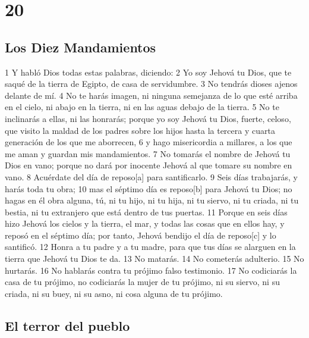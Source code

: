 \chapter{20}

\section*{Los Diez Mandamientos}

1 Y habló Dios todas estas palabras, diciendo:
2 Yo soy Jehová tu Dios, que te saqué de la tierra de Egipto, de casa de servidumbre.
3 No tendrás dioses ajenos delante de mí.
4 No te harás imagen, ni ninguna semejanza de lo que esté arriba en el cielo, ni abajo en la tierra, ni en las aguas debajo de la tierra.
5 No te inclinarás a ellas, ni las honrarás; porque yo soy Jehová tu Dios, fuerte, celoso, que visito la maldad de los padres sobre los hijos hasta la tercera y cuarta generación de los que me aborrecen,
6 y hago misericordia a millares, a los que me aman y guardan mis mandamientos.
7 No tomarás el nombre de Jehová tu Dios en vano; porque no dará por inocente Jehová al que tomare su nombre en vano.
8 Acuérdate del día de reposo[a] para santificarlo.
9 Seis días trabajarás, y harás toda tu obra;
10 mas el séptimo día es reposo[b] para Jehová tu Dios; no hagas en él obra alguna, tú, ni tu hijo, ni tu hija, ni tu siervo, ni tu criada, ni tu bestia, ni tu extranjero que está dentro de tus puertas.
11 Porque en seis días hizo Jehová los cielos y la tierra, el mar, y todas las cosas que en ellos hay, y reposó en el séptimo día; por tanto, Jehová bendijo el día de reposo[c] y lo santificó.
12 Honra a tu padre y a tu madre, para que tus días se alarguen en la tierra que Jehová tu Dios te da.
13 No matarás.
14 No cometerás adulterio.
15 No hurtarás.
16 No hablarás contra tu prójimo falso testimonio.
17 No codiciarás la casa de tu prójimo, no codiciarás la mujer de tu prójimo, ni su siervo, ni su criada, ni su buey, ni su asno, ni cosa alguna de tu prójimo.

\section*{El terror del pueblo}

